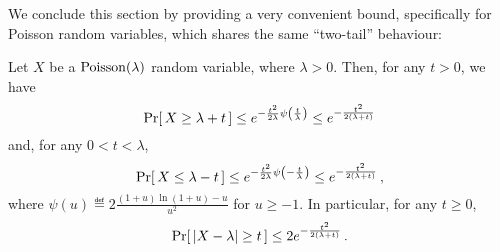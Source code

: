 We conclude this section by providing a very convenient bound, specifically for Poisson random variables, which shares the same ``two-tail'' behaviour:

\newcommand{\bennett}[1]{\psi\mleft(#1\mright)}
\begin{theorem}\label{theo:main:poisson:bounds}
Let $X$ be a $\poisson{\lambda}$ random variable, where $\lambda > 0$. Then, for any $t>0$, we have
\begin{equation}\label{eq:poisson:upper:tail}
    \probaOf{ X \geq \lambda + t} \leq e^{-\frac{t^2}{2\lambda}\bennett{\frac{t}{\lambda}}} \leq e^{-\frac{t^2}{2(\lambda+t)}}
\end{equation}
and, for any $0<t< \lambda$,
\begin{equation}\label{eq:poisson:lower:tail}
  \probaOf{ X \leq \lambda - t} \leq e^{-\frac{t^2}{2\lambda}\bennett{-\frac{t}{\lambda}}} \leq e^{-\frac{t^2}{2(\lambda+t)}}\,,
\end{equation}
where $\psi(u)\eqdef 2\frac{(1+u)\ln(1+u)-u}{u^2}$ for $u\geq -1$.
In particular, for any $t\geq 0$,
\begin{equation}\label{eq:poisson:both:tail}
  \probaOf{ \abs{X -\lambda} \geq t} \leq 2e^{-\frac{t^2}{2(\lambda+t)}}\,.
\end{equation}
\end{theorem}
